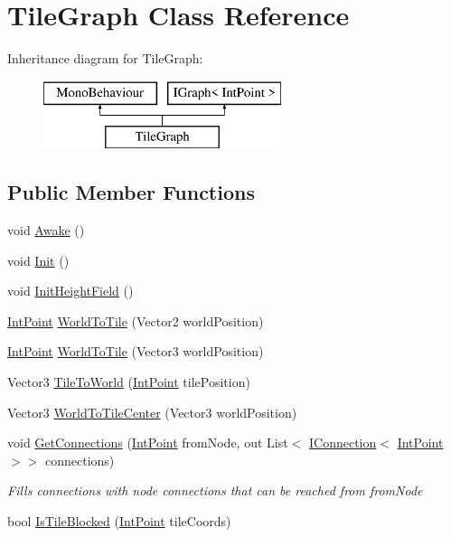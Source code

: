 \hypertarget{class_tile_graph}{}\section{Tile\+Graph Class Reference}
\label{class_tile_graph}
Inheritance diagram for Tile\+Graph\+:\begin{figure}[H]
\begin{center}
\leavevmode
\includegraphics[height=2.000000cm]{class_tile_graph}
\end{center}
\end{figure}
\subsection*{Public Member Functions}
\begin{DoxyCompactItemize}
\item 
void \mbox{\hyperlink{class_tile_graph_a4e921f79aca67d58cad7367227fe8c06}{Awake}} ()
\item 
void \mbox{\hyperlink{class_tile_graph_a349a2602be0a8c9473aed6103955a2a6}{Init}} ()
\item 
void \mbox{\hyperlink{class_tile_graph_a839b7d0deee777d52006ad5678170694}{Init\+Height\+Field}} ()
\item 
\mbox{\hyperlink{struct_int_point}{Int\+Point}} \mbox{\hyperlink{class_tile_graph_a470894695f1deb2d9c127a1e50d0b859}{World\+To\+Tile}} (Vector2 world\+Position)
\item 
\mbox{\hyperlink{struct_int_point}{Int\+Point}} \mbox{\hyperlink{class_tile_graph_a121a3327fefcf7009e2dc3c5d1c9d310}{World\+To\+Tile}} (Vector3 world\+Position)
\item 
Vector3 \mbox{\hyperlink{class_tile_graph_ae13070f1638b7409ad1d63b5551bc3fa}{Tile\+To\+World}} (\mbox{\hyperlink{struct_int_point}{Int\+Point}} tile\+Position)
\item 
Vector3 \mbox{\hyperlink{class_tile_graph_a23609e10dfa34c3b498c3c0a35548e0f}{World\+To\+Tile\+Center}} (Vector3 world\+Position)
\item 
void \mbox{\hyperlink{class_tile_graph_a36cabbaca38766f02b95a82ee0967ebc}{Get\+Connections}} (\mbox{\hyperlink{struct_int_point}{Int\+Point}} from\+Node, out List$<$ \mbox{\hyperlink{interface_i_connection}{I\+Connection}}$<$ \mbox{\hyperlink{struct_int_point}{Int\+Point}} $>$$>$ connections)
\begin{DoxyCompactList}\small\item\em Fills connections with node connections that can be reached from from\+Node \end{DoxyCompactList}\item 
bool \mbox{\hyperlink{class_tile_graph_a9213b3332566a8e720dd28a05376001c}{Is\+Tile\+Blocked}} (\mbox{\hyperlink{struct_int_point}{Int\+Point}} tile\+Coords)
\end{DoxyCompactItemize}
